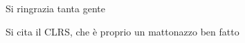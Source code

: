 Si ringrazia tanta gente

Si cita il CLRS, che è proprio un mattonazzo \cite{Cormen:2009:IAT:1614191} ben fatto
